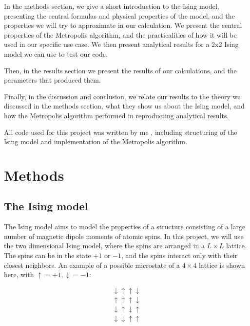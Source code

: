 \documentclass[reprint,english,notitlepage]{revtex4-1}
\begin{document}
	In the methods section, we give a short introduction to the Ising model, presenting the central formulas and physical properties of the model, and the properties we will try to approximate in our calculation. We present the central properties of the Metropolis algorithm, and the practicalities of how it will be used in our specific use case. We then present analytical results for a 2x2 Ising model we can use to test our code.
	
	Then, in the results section we present the results of our calculations, and the parameters that produced them.
	
	Finally, in the discussion and conclusion, we relate our results to the theory we discussed in the methods section, what they show us about the Ising model, and how the Metropolis algorithm performed in reproducting analytical results.
	
	All code used for this project was written by me \cite{myRepo}, including structuring of the Ising model and implementation of the Metropolis algorithm.

\section{Methods} %
	
\subsection{The Ising model}
	The Ising model aims to model the properties of a structure consisting of a large number of magnetic dipole moments of atomic spins. In this project, we will use the two dimensional Ising model, where the spins are arranged in a $L\times L$ lattice. The spins can be in the state $+1$ or $-1$, and the spins interact only with their closest neighbors. An example of a possible microstate of a $4 \times 4$ lattice is shown here, with $\uparrow = +1, \downarrow = -1$:
	
	\begin{equation*}
	\begin{aligned}
	\downarrow \uparrow \uparrow \downarrow \\
	\uparrow \uparrow \uparrow \downarrow \\
	\downarrow \uparrow \downarrow \uparrow \\
	\downarrow \downarrow \uparrow \uparrow
	\end{aligned}
	\end{equation*}
	
\end{document}
